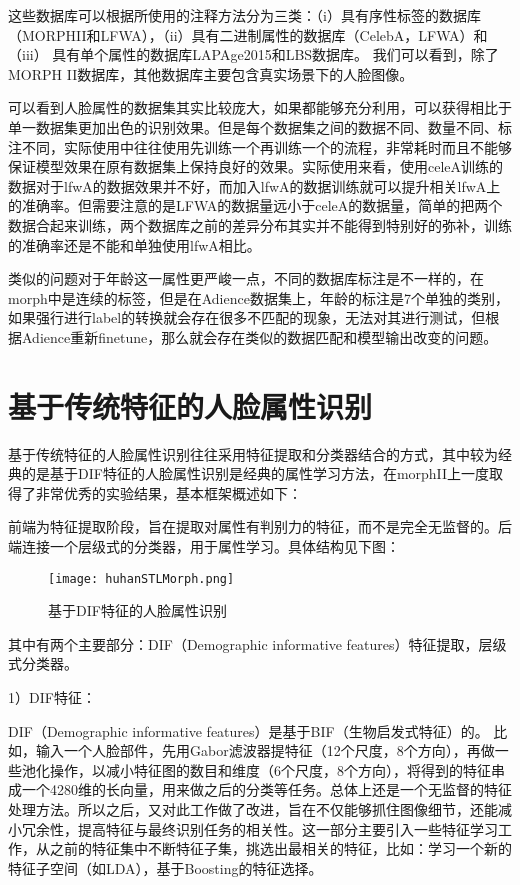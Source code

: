 这些数据库可以根据所使用的注释方法分为三类：（i）具有序性标签的数据库（MORPHII和LFWA），（ii）具有二进制属性的数据库（CelebA，LFWA）和（iii） 具有单个属性的数据库LAPAge2015和LBS数据库。 我们可以看到，除了MORPH II数据库，其他数据库主要包含真实场景下的人脸图像。  

可以看到人脸属性的数据集其实比较庞大，如果都能够充分利用，可以获得相比于单一数据集更加出色的识别效果。但是每个数据集之间的数据不同、数量不同、标注不同，实际使用中往往使用先训练一个再训练一个的流程，非常耗时而且不能够保证模型效果在原有数据集上保持良好的效果。实际使用来看，使用celeA训练的数据对于lfwA的数据效果并不好，而加入lfwA的数据训练就可以提升相关lfwA上的准确率。但需要注意的是LFWA的数据量远小于celeA的数据量，简单的把两个数据合起来训练，两个数据库之前的差异分布其实并不能得到特别好的弥补，训练的准确率还是不能和单独使用lfwA相比。

类似的问题对于年龄这一属性更严峻一点，不同的数据库标注是不一样的，在morph中是连续的标签，但是在Adience数据集上，年龄的标注是7个单独的类别，如果强行进行label的转换就会存在很多不匹配的现象，无法对其进行测试，但根据Adience重新finetune，那么就会存在类似的数据匹配和模型输出改变的问题。

\section{基于传统特征的人脸属性识别}
基于传统特征的人脸属性识别\cite{HUHAN}往往采用特征提取和分类器结合的方式，其中较为经典的是基于DIF特征的人脸属性识别是经典的属性学习方法，在morphII上一度取得了非常优秀的实验结果，基本框架概述如下：

前端为特征提取阶段，旨在提取对属性有判别力的特征，而不是完全无监督的。后端连接一个层级式的分类器，用于属性学习。具体结构见下图：
\begin{figure}[!ht]
 \centering
	\texttt{[image: huhanSTLMorph.png]}
	\caption{基于DIF特征的人脸属性识别}
\end{figure}

其中有两个主要部分：DIF（Demographic informative features）特征提取，层级式分类器。

1）DIF特征：

DIF（Demographic informative features）是基于BIF（生物启发式特征）的。
比如，输入一个人脸部件，先用Gabor滤波器提特征（12个尺度，8个方向），再做一些池化操作，以减小特征图的数目和维度（6个尺度，8个方向），将得到的特征串成一个4280维的长向量，用来做之后的分类等任务。总体上还是一个无监督的特征处理方法。所以之后，又对此工作做了改进，旨在不仅能够抓住图像细节，还能减小冗余性，提高特征与最终识别任务的相关性。这一部分主要引入一些特征学习工作，从之前的特征集中不断特征子集，挑选出最相关的特征，比如：学习一个新的特征子空间（如LDA），基于Boosting的特征选择。

